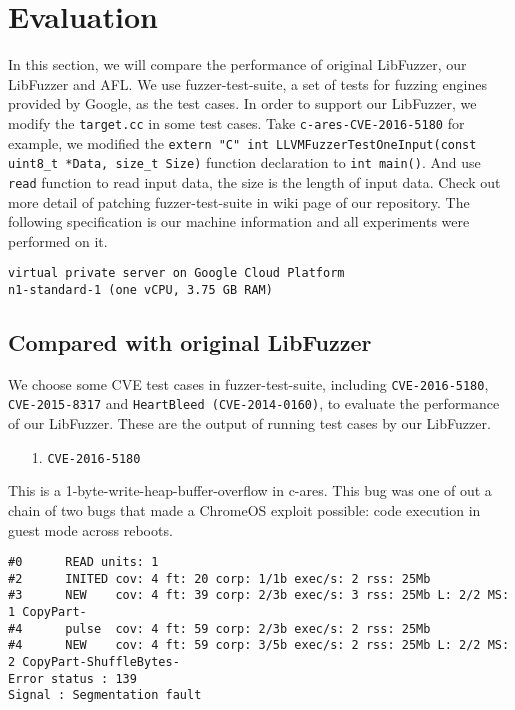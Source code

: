 
\section{Evaluation}
\label{sec:eval}

In this section, we will compare the performance of original LibFuzzer, our LibFuzzer and AFL. We use fuzzer-test-suite, a set of tests for fuzzing engines provided by Google, as the test cases. In order to support our LibFuzzer, we modify the \texttt{target.cc} in some test cases. Take \texttt{c-ares-CVE-2016-5180} for example, we modified the \texttt{extern "C" int LLVMFuzzerTestOneInput(const uint8\_t *Data, size\_t Size)} function declaration to \texttt{int main()}. And use \texttt{read} function to read input data, the size is the length of input data. Check out more detail of patching fuzzer-test-suite in wiki page of our repository. The following specification is our machine information and all experiments were performed on it.

\begin{lstlisting}
virtual private server on Google Cloud Platform
n1-standard-1 (one vCPU, 3.75 GB RAM)
\end{lstlisting}

\subsection{Compared with original LibFuzzer}

We choose some CVE test cases in fuzzer-test-suite, including \texttt{CVE-2016-5180}, \texttt{CVE-2015-8317} and \texttt{HeartBleed (CVE-2014-0160)}, to evaluate the performance of our LibFuzzer. These are the output of running test cases by our LibFuzzer.

\begin{enumerate}
    \item [1.] \texttt{CVE-2016-5180}
\end{enumerate}

This is a 1-byte-write-heap-buffer-overflow in c-ares. This bug was one of out a chain of two bugs that made a ChromeOS exploit possible: code execution in guest mode across reboots.

\begin{lstlisting}
#0      READ units: 1
#2      INITED cov: 4 ft: 20 corp: 1/1b exec/s: 2 rss: 25Mb
#3      NEW    cov: 4 ft: 39 corp: 2/3b exec/s: 3 rss: 25Mb L: 2/2 MS: 1 CopyPart-
#4      pulse  cov: 4 ft: 59 corp: 2/3b exec/s: 2 rss: 25Mb
#4      NEW    cov: 4 ft: 59 corp: 3/5b exec/s: 2 rss: 25Mb L: 2/2 MS: 2 CopyPart-ShuffleBytes-
Error status : 139
Signal : Segmentation fault
\end{lstlisting}

